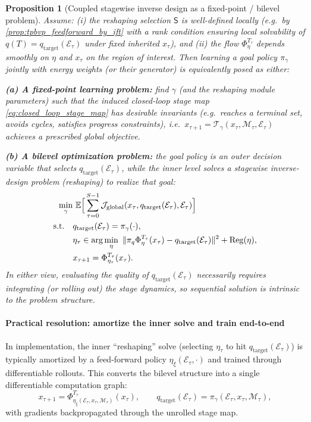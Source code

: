 \documentclass{article} %
\newtheorem{proposition}[theorem]{Proposition}
\begin{document}
\begin{proposition}[Coupled stagewise inverse design as a fixed-point / bilevel problem]
\label{prop:coupled_goal_and_energy}
Assume: (i) the reshaping selection $\mathsf S$ is well-defined locally (e.g.\ by \cref{prop:tpbvp_feedforward_by_ift} with a
rank condition ensuring local solvability of $q(T)=q_{\mathrm{target}}(\mathcal{E}_{\tau})$ under fixed inherited $x_\tau$),
and (ii) the flow $\Phi^{T_\tau}_{\eta}$ depends smoothly on $\eta$ and $x_\tau$ on the region of interest.
Then learning a goal policy $\pi_\gamma$ jointly with energy weights (or their generator) is equivalently posed as either:

\smallskip
\noindent\textbf{(a) A fixed-point learning problem:} find $\gamma$ (and the reshaping module parameters) such that the induced
closed-loop stage map \cref{eq:closed_loop_stage_map} has desirable invariants (e.g.\ reaches a terminal set, avoids cycles,
satisfies progress constraints), i.e.\ $x_{\tau+1}=\mathcal T_\gamma(x_\tau,\mathcal M_\tau,\mathcal E_\tau)$ achieves a
prescribed global objective.

\smallskip
\noindent\textbf{(b) A bilevel optimization problem:} the goal policy is an outer decision variable that selects $q_{\mathrm{target}}(\mathcal{E}_{\tau})$,
while the inner level solves a stagewise inverse-design problem (reshaping) to realize that goal:
\begin{equation}  
\begin{aligned}
\min_{\gamma}&\ \mathbb E\Big[\sum_{\tau=0}^{S-1} \mathcal J_{\rm global}(x_\tau,q_{\mathrm{target}}(\mathcal{E}_{\tau}),\mathcal E_\tau)\Big]
\\
\text{s.t.}\quad&
q_{\mathrm{target}}(\mathcal{E}_{\tau})=\pi_\gamma(\cdot), \\
&\eta_\tau\in\arg\min_{\eta}\ \|\pi_q\Phi^{T_\tau}_{\eta}(x_\tau)-q_{\mathrm{target}}(\mathcal{E}_{\tau})\|^2+\mathrm{Reg}(\eta),
\\ 
&x_{\tau+1}=\Phi^{T_\tau}_{\eta_\tau}(x_\tau).    
\end{aligned}
\end{equation}
In either view, evaluating the quality of $q_{\mathrm{target}}(\mathcal{E}_{\tau})$ necessarily requires integrating (or rolling out) the
stage dynamics, so sequential solution is intrinsic to the problem structure.
\end{proposition}

\paragraph{Practical resolution: amortize the inner solve and train end-to-end}
\label{rem:amortize_inner}
In implementation, the inner ``reshaping'' solve (selecting $\eta_\tau$ to hit $q_{\mathrm{target}}(\mathcal{E}_{\tau})$) is typically amortized
by a feed-forward policy $\eta_\xi(\mathcal E_\tau,\cdot)$ and trained through differentiable rollouts.
This converts the bilevel structure into a single differentiable computation graph:
\[
x_{\tau+1} = \Phi^{T_\tau}_{\eta_\xi(\mathcal E_\tau,x_\tau,\mathcal M_\tau)}(x_\tau),
\qquad
q_{\mathrm{target}}(\mathcal{E}_{\tau})=\pi_\gamma(\mathcal E_\tau,x_\tau,\mathcal M_\tau),
\]
with gradients backpropagated through the unrolled stage map.
\end{document}
